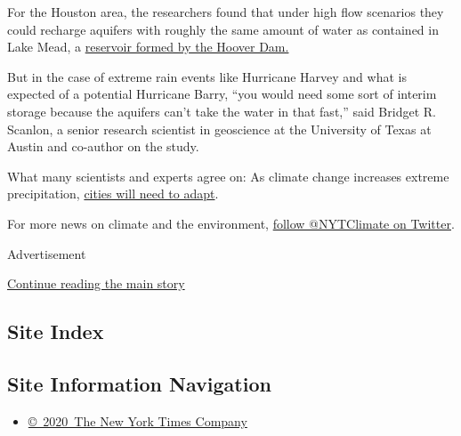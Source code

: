 For the Houston area, the researchers found that under high flow
scenarios they could recharge aquifers with roughly the same amount of
water as contained in Lake Mead, a
\href{https://www.nytimes3xbfgragh.onion/2019/03/19/climate/colorado-river-water.html}{reservoir
formed by the Hoover Dam.}

But in the case of extreme rain events like Hurricane Harvey and what is
expected of a potential Hurricane Barry, ``you would need some sort of
interim storage because the aquifers can't take the water in that
fast,'' said Bridget R. Scanlon, a senior research scientist in
geoscience at the University of Texas at Austin and co-author on the
study.

What many scientists and experts agree on: As climate change increases
extreme precipitation,
\href{https://www.nytimes3xbfgragh.onion/2019/06/19/climate/seawalls-cities-cost-climate-change.html}{cities
will need to adapt}.

For more news on climate and the environment,
\href{https://twitter.com/nytclimate}{follow @NYTClimate on Twitter}.

Advertisement

\protect\hyperlink{after-bottom}{Continue reading the main story}

\hypertarget{site-index}{%
\subsection{Site Index}\label{site-index}}

\hypertarget{site-information-navigation}{%
\subsection{Site Information
Navigation}\label{site-information-navigation}}

\begin{itemize}
\tightlist
\item
  \href{https://help.nytimes3xbfgragh.onion/hc/en-us/articles/115014792127-Copyright-notice}{©~2020~The
  New York Times Company}
\end{itemize}

